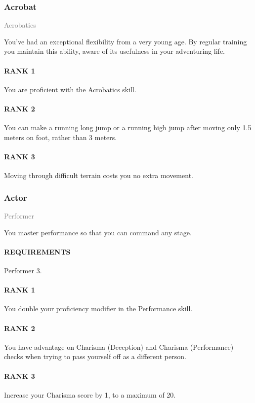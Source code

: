 \subsubsection{Acrobat} \label{tal::acrobat}
\small{\textcolor{gray}{Acrobatics}}

\normalsize
You've had an exceptional flexibility from a very young age.
By regular training you maintain this ability, aware of its usefulness in your adventuring life.
\paragraph{RANK 1} You are proficient with the Acrobatics skill.
\paragraph{RANK 2} You can make a running long jump or a running high jump after moving only 1.5 meters on foot, rather than 3 meters.
\paragraph{RANK 3} Moving through difficult terrain costs you no extra movement.

\subsubsection{Actor} \label{tal::actor}
\small{\textcolor{gray}{Performer}}

\normalsize
You master performance so that you can command any stage.
\paragraph{REQUIREMENTS} Performer 3.
\paragraph{RANK 1} You double your proficiency modifier in the Performance skill.
\paragraph{RANK 2} You have advantage on Charisma (Deception) and Charisma (Performance) checks when trying to pass yourself off as a different person.
\paragraph{RANK 3} Increase your Charisma score by 1, to a maximum of 20.

